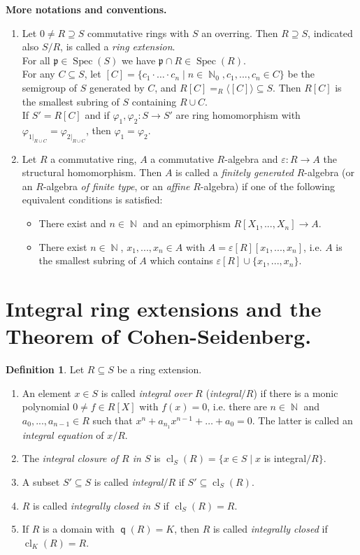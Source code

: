 \documentclass[12pt,a4paper]{report}
\theoremstyle{definition}
\newtheorem{defn}[theorem]{Definition}
\theoremstyle{num.custom-title}
\DeclareMathOperator{\N}{\mathbb{N}}
\DeclareMathOperator{\sse}{\subseteq}
\DeclareMathOperator{\cl}{cl}
\DeclareMathOperator{\Spec}{Spec}
\DeclareMathOperator{\q}{\mathsf{q}}
\newcommand{\p}{\mathfrak{p}}
\renewcommand{\epsilon}{\varepsilon}
\renewcommand{\phi}{\varphi}
\begin{document}
\textbf{More notations and conventions.}
\begin{enumerate}
\item Let $0 \neq R \supseteq S$ commutative rings with $S$ an overring. Then $R \supseteq S$, indicated also $S/R$, is called a \emph{ring extension}.\\
For all $\p \in \Spec(S)$ we have $\p \cap R \in \Spec(R)$.\\
For any $C \sse S$, let $[C] = \{ c_1 \cdot \ldots \cdot c_n \mid n \in \N _0, c_1,...,c_n \in C \}$ be the semigroup of $S$ generated by $C$, and $R[C] = _R \langle [C] \rangle \sse S$. Then $R[C]$ is the smallest subring of $S$ containing $R \cup C$.\\
If $S'=R[C]$ and if $\phi_1,\phi_2 : S \to S'$ are ring homomorphism with $\phi_{1|_{R \cup C}} = \phi_{2|_{R \cup C}}$, then $\phi_1 = \phi_2$.
\item Let $R$ a commutative ring, $A$ a commutative $R$-algebra and $\epsilon : R \to A$ the structural homomorphism. Then $A$ is called a \emph{finitely generated} $R$-algebra (or an $R$-algebra \emph{of finite type}, or an \emph{affine} $R$-algebra) if one of the following equivalent conditions is satisfied:
\begin{itemize}
\item There exist and $n \in \N$ and an epimorphism $R[X_1,...,X_n] \to A$.
\item There exist $n \in \N$, $x_1,...,x_n \in A$ with $A= \epsilon[R] [x_1,...,x_n]$, i.e. $A$ is the smallest subring of $A$ which contains $\epsilon[R] \cup \{x_1,...,x_n\}$.
\end{itemize}
\end{enumerate}

\section{Integral ring extensions and the Theorem of Cohen-Seidenberg.}

\begin{defn}
Let $R \sse S$ be a ring extension.
\begin{enumerate}
\item An element $x \in S$ is called \emph{integral over} $R$ (\emph{integral}$/R$) if there is a monic polynomial $0 \neq f \in R[X]$ with $f(x)=0$, i.e. there are $n \in \N$ and $a_0,...,a_{n-1} \in R$  such that $x^n+a_{n_1}x^{n-1} + \ldots + a_0 = 0$. The latter is called an \emph{integral equation} of $x/R$.
\item The \emph{integral closure of $R$ in $S$} is $\cl_S(R)=\{x \in S \mid x$ is integral$/R\}$.
\item A subset $S' \sse S$ is called \emph{integral}$/R$ if $S' \sse \cl_S(R)$.
\item $R$ is called \emph{integrally closed in $S$} if $\cl_S(R)=R$.
\item If $R$ is a domain with $\q(R)=K$, then $R$ is called \emph{integrally closed} if $\cl_K(R)=R$.
\end{enumerate}
\end{defn}
\end{document}
